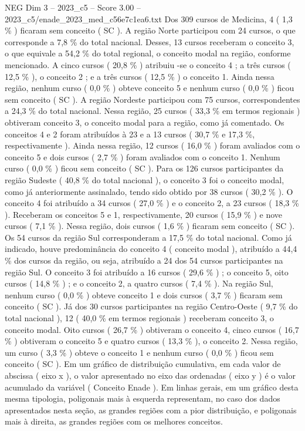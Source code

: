 \begin{textsample}{NEG Dim 3 – 2023\_c5 – Score 3.00 – 2023\_c5/enade\_2023\_med\_c56e7c1ea6.txt}
Dos 309 cursos de Medicina, 4 ( 1,3 \% ) ficaram sem conceito ( SC ).
A região Norte participou com 24 cursos, o que corresponde a 7,8 \% do total nacional.
Desses, 13 cursos receberam o conceito 3, o que equivale a 54,2 \% do total regional, o conceito modal na região, conforme mencionado.
A cinco cursos ( 20,8 \% ) atribuiu -se o conceito 4 ; a três cursos ( 12,5 \% ), o conceito 2 ; e a três cursos ( 12,5 \% ) o conceito 1.
Ainda nessa região, nenhum curso ( 0,0 \% ) obteve conceito 5 e nenhum curso ( 0,0 \% ) ficou sem conceito ( SC ).
A região Nordeste participou com 75 cursos, correspondentes a 24,3 \% do total nacional.
Nessa região, 25 cursos ( 33,3 \% em termos regionais ) obtiveram conceito 3, o conceito modal para a região, como já comentado.
Os conceitos 4 e 2 foram atribuídos à 23 e a 13 cursos ( 30,7 \% e 17,3 \%, respectivamente ).
Ainda nessa região, 12 cursos ( 16,0 \% ) foram avaliados com o conceito 5 e dois cursos ( 2,7 \% ) foram avaliados com o conceito 1.
Nenhum curso ( 0,0 \% ) ficou sem conceito ( SC ).
Para os 126 cursos participantes da região Sudeste ( 40,8 \% do total nacional ), o conceito 3 foi o conceito modal, como já anteriormente assinalado, tendo sido obtido por 38 cursos ( 30,2 \% ).
O conceito 4 foi atribuído a 34 cursos ( 27,0 \% ) e o conceito 2, a 23 cursos ( 18,3 \% ).
Receberam os conceitos 5 e 1, respectivamente, 20 cursos ( 15,9 \% ) e nove cursos ( 7,1 \% ).
Nessa região, dois cursos ( 1,6 \% ) ficaram sem conceito ( SC ).
Os 54 cursos da região Sul corresponderam a 17,5 \% do total nacional.
Como já indicado, houve predominância do conceito 4 ( conceito modal ), atribuído a 44,4 \% dos cursos da região, ou seja, atribuído a 24 dos 54 cursos participantes na região Sul.
O conceito 3 foi atribuído a 16 cursos ( 29,6 \% ) ; o conceito 5, oito cursos ( 14,8 \% ) ; e o conceito 2, a quatro cursos ( 7,4 \% ).
Na região Sul, nenhum curso ( 0,0 \% ) obteve conceito 1 e dois cursos ( 3,7 \% ) ficaram sem conceito ( SC ).
Já dos 30 cursos participantes na região Centro-Oeste ( 9,7 \% do total nacional ), 12 ( 40,0 \% em termos regionais ) receberam conceito 3, o conceito modal.
Oito cursos ( 26,7 \% ) obtiveram o conceito 4, cinco cursos ( 16,7 \% ) obtiveram o conceito 5 e quatro cursos ( 13,3 \% ), o conceito 2.
Nessa região, um curso ( 3,3 \% ) obteve o conceito 1 e nenhum curso ( 0,0 \% ) ficou sem conceito ( SC ).
Em um gráfico de distribuição cumulativa, em cada valor de abscissa ( eixo x ), o valor apresentado no eixo das ordenadas ( eixo y ) é o valor acumulado da variável ( Conceito Enade ).
Em linhas gerais, em um gráfico desta mesma tipologia, poligonais mais à esquerda representam, no caso dos dados apresentados nesta seção, as grandes regiões com a pior distribuição, e poligonais mais à direita, as grandes regiões com os melhores conceitos.

\end{textsample}

